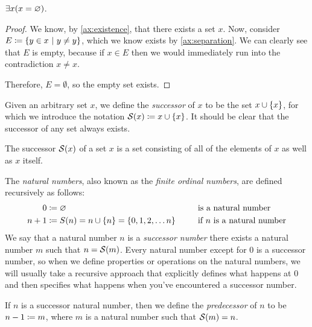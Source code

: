 \begin{theorem}
    \(\exists x \pn*{x = \emptyset}\).
\end{theorem}
\begin{proof}
    We know, by \autoref{ax:existence}, that there exists a set \(x\).
    Now, consider \(E \defn \set*{y \in x \suchthat  y \neq y}\),
    which we know exists by \autoref{ax:separation}.
    We can clearly see that \(E\) is empty,
    because if \(x \in E\) then we would immediately run into the contradiction \(x \neq x\).

    Therefore, \(E = \emptyset\), so the empty set exists.
\end{proof}

\begin{definition}
    Given an arbitrary set \(x\), we define the \emph{successor} of \(x\) to be the set \(x \union \set*{x}\),
    for which we introduce the notation \(\successor{x} \defn x \union \set*{x}\).
    It should be clear that the successor of any set always exists.

    \begin{note}
        The successor \(\successor{x}\) of a set \(x\) is a set consisting of
        all of the elements of \(x\) as well as \(x\) itself.
    \end{note}
\end{definition}

\begin{definition}
    The \emph{natural numbers}, also known as the \emph{finite ordinal numbers},
    are defined recursively as follows:
    \begin{alignat*}{2}
        0 &\defn \emptyset &&\text{ is a natural number} \\
        n + 1 &\defn S(n)
               = n \union \set*{n}
               = \set{0, 1, 2, \dots n}~~~~&&\text{ if } n \text{ is a natural number}
    \end{alignat*}
    We say that a natural number \(n\) is a \emph{successor number}
    \iffbydefn there exists a natural number \(m\) such that \(n = \successor{m}\).
    Every natural number except for \(0\) is a successor number,
    so when we define properties or operations on the natural numbers,
    we will usually take a recursive approach that explicitly defines what happens at \(0\)
    and then specifies what happens when you've encountered a successor number.

    If \(n\) is a successor natural number,
    then we define the \emph{predecessor} of \(n\) to be \(n - 1 \coloneqq m\),
    where \(m\) is a natural number such that \(\successor{m} = n\).
\end{definition}

